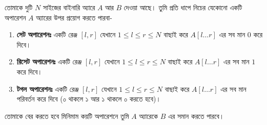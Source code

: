 \begin{problem}
তোমাকে দুটি $N$ সাইজের বাইনারি অ্যারে $A$ আর $B$ দেওয়া আছে। তুমি প্রতি ধাপে নিচের যেকোনো একটি অপারেশন $A$ অ্যারের উপর প্রয়োগ করতে পারবা-
\begin{enumerate}
	\item \textbf{সেট অপারেশনঃ} একটি রেঞ্জ $[l, r]$ যেখানে $1 \le l \le r \le N$ বাছাই করে $A[l \ldots r]$ এর সব মান $0$ করে দিবে।
	\item \textbf{রিসেট অপারেশনঃ} একটি রেঞ্জ $[l, r]$ যেখানে $1 \le l \le r \le N$ বাছাই করে $A[l \ldots r]$ এর সব মান $1$ করে দিবে।
	\item \textbf{টগল অপারেশনঃ} একটি রেঞ্জ $[l, r]$ যেখানে $1 \le l \le r \le N$ বাছাই করে $A[l \ldots r]$ এর সব মান পরিবর্তন করে দিবে (০ থাকলে ১ আর ১ থাকলে ০ করতে হবে)।
\end{enumerate}
তোমাকে বের করতে হবে মিনিমাম কয়টি অপারেশনে তুমি $A$ অ্যারেকে $B$ এর সমান করতে পারবে।
\end{problem}
